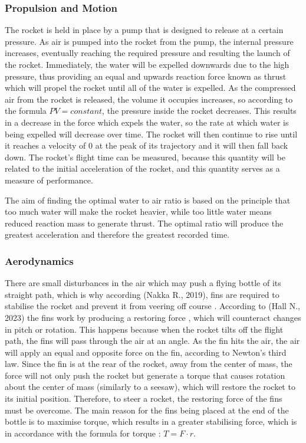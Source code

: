 \documentclass[14pt]{article}
\begin{document}
\subsubsection{Propulsion and Motion}
The rocket is held in place by a pump that is designed to release at a certain pressure. As air is pumped into the rocket from the pump, the internal pressure increases, eventually reaching the required pressure and resulting the launch of the rocket. Immediately, the water will be expelled downwards due to the high pressure, thus providing an equal and upwards reaction force known as thrust which will propel the rocket until all of the water is expelled. As the compressed air from the rocket is released, the volume it occupies increases, so according to the formula \(PV = constant\), the pressure inside the rocket decreases. This results in a decrease in the force which expels the water, so the rate at which water is being expelled will decrease over time. The rocket will then continue to rise until it reaches a velocity of 0 at the peak of its trajectory and it will then fall back down. The rocket's flight time can be measured, because this quantity will be related to the initial acceleration of the rocket, and this quantity serves as a measure of performance. 

The aim of finding the optimal water to air ratio is based on the principle that too much water will make the rocket heavier, while too little water means reduced reaction mass to generate thrust. The optimal ratio will produce the greatest acceleration and therefore the greatest recorded time. 
\subsubsection{Aerodynamics}
There are small disturbances in the air which may push a flying bottle of its straight path, which is why according (Nakka R., 2019), fins are required to stabilise the rocket and prevent it from veering off course \cite{4}. According to (Hall N., 2023) the fins work by producing a restoring force \cite{5}, which will counteract changes in pitch or rotation. This happens because when the rocket tilts off the flight path, the fins will pass through the air at an angle. As the fin hits the air, the air will apply
an equal and opposite force on the fin, according to Newton's third law. Since the fin is at the rear of the rocket, away from the center of mass,
the force will not only push the rocket but generate a torque that causes rotation about the center of mass (similarly to a seesaw), which will restore the rocket to its initial position.  Therefore,
to steer a rocket, the restoring force of the fins must be overcome.
The main reason for the fins being placed at the end of the bottle is to maximise torque, which results in a greater stabilising force, which is in accordance with the formula
for torque : \(T = F \cdot r\).
\end{document}
